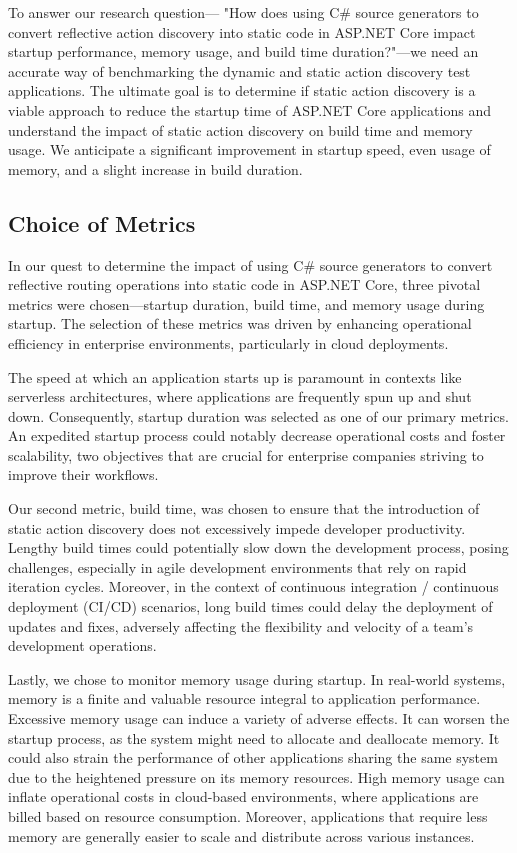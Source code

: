 To answer our research question— "How does using C\# source generators to convert reflective action discovery into static code in ASP.NET Core impact startup performance, memory usage, and build time duration?"—we need an accurate way of benchmarking the dynamic and static action discovery test applications. The ultimate goal is to determine if static action discovery is a viable approach to reduce the startup time of ASP.NET Core applications and understand the impact of static action discovery on build time and memory usage. We anticipate a significant improvement in startup speed, even usage of memory, and a slight increase in build duration.

\subsection{Choice of Metrics}

In our quest to determine the impact of using C\# source generators to convert reflective routing operations into static code in ASP.NET Core, three pivotal metrics were chosen—startup duration, build time, and memory usage during startup. The selection of these metrics was driven by enhancing operational efficiency in enterprise environments, particularly in cloud deployments.

The speed at which an application starts up is paramount in contexts like serverless architectures, where applications are frequently spun up and shut down. Consequently, startup duration was selected as one of our primary metrics. An expedited startup process could notably decrease operational costs and foster scalability, two objectives that are crucial for enterprise companies striving to improve their workflows.

Our second metric, build time, was chosen to ensure that the introduction of static action discovery does not excessively impede developer productivity. Lengthy build times could potentially slow down the development process, posing challenges, especially in agile development environments that rely on rapid iteration cycles. Moreover, in the context of continuous integration / continuous deployment (CI/CD) scenarios, long build times could delay the deployment of updates and fixes, adversely affecting the flexibility and velocity of a team's development operations.

Lastly, we chose to monitor memory usage during startup. In real-world systems, memory is a finite and valuable resource integral to application performance. Excessive memory usage can induce a variety of adverse effects. It can worsen the startup process, as the system might need to allocate and deallocate memory. It could also strain the performance of other applications sharing the same system due to the heightened pressure on its memory resources. High memory usage can inflate operational costs in cloud-based environments, where applications are billed based on resource consumption. Moreover, applications that require less memory are generally easier to scale and distribute across various instances.

